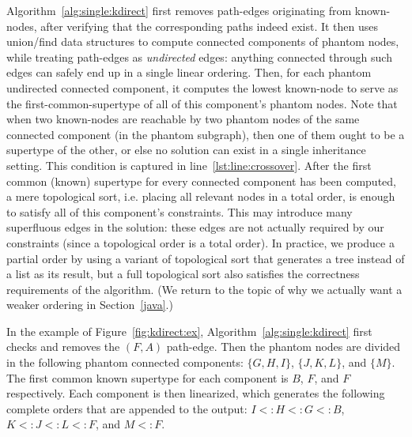Algorithm~\ref{alg:single:kdirect} first removes path-edges
originating from known-nodes, after verifying that the corresponding
paths indeed exist. It then uses union/find data structures to compute
connected components of phantom nodes, while treating path-edges
as \emph{undirected} edges: anything connected through such edges can
safely end up in a single linear ordering. Then, for each phantom
undirected connected component, it computes the lowest known-node to
serve as the first-common-supertype of all of this component's phantom
nodes. Note that when two known-nodes are reachable by two phantom
nodes of the same connected component (in the phantom subgraph), then
one of them ought to be a supertype of the other, or else no solution
can exist in a single inheritance setting. This condition is captured
in line~\ref{lst:line:crossover}. After the first common (known)
supertype for every connected component has been computed, a mere
topological sort, i.e. placing all relevant nodes in a total order, is
enough to satisfy all of this component's constraints. This may
introduce many superfluous edges in the solution: these edges are not
actually required by our constraints (since a topological order is a
total order). In practice, we produce a partial order by using a
variant of topological sort that generates a tree instead of a list as
its result, but a full topological sort also satisfies the correctness
requirements of the algorithm. (We return to the topic of why we
actually want a weaker ordering in Section~\ref{java}.)

In the example of Figure~\ref{fig:kdirect:ex},
Algorithm~\ref{alg:single:kdirect} first checks and removes the
$(F,A)$ path-edge. Then the phantom nodes are divided in the following
phantom connected components: $\{G,H,I\}$, $\{J,K,L\}$, and
$\{M\}$. The first common known supertype for each component is $B$,
$F$, and $F$ respectively. Each component is then linearized, which
generates the following complete orders that are appended to the
output: $I <: H <: G <: B$, $K <: J <: L <: F$, and $M <: F$.



